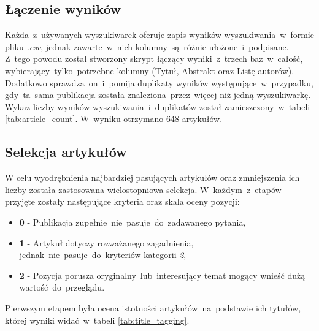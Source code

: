 \subsection{Łączenie wyników}
Każda~z~używanych wyszukiwarek oferuje zapis wyników wyszukiwania~w~formie pliku {\it .csv}, jednak zawarte~w~nich kolumny~są~różnie ułożone~i~podpisane. Z~tego powodu został stworzony skrypt łączący wyniki~z~trzech baz~w~całość, wybierający~tylko~potrzebne kolumny (Tytuł, Abstrakt oraz Listę autorów). Dodatkowo sprawdza~on~i~pomija duplikaty wyników występujące~w~przypadku, gdy~ta~sama publikacja została znaleziona~przez~więcej niż jedną wyszukiwarkę. Wykaz liczby wyników wyszukiwania~i~duplikatów został zamieszczony~w~tabeli \ref{tab:article_count}. W~wyniku otrzymano 648 artykułów.

\subsection{Selekcja artykułów}
W celu wyodrębnienia najbardziej pasujących artykułów oraz zmniejszenia ich liczby została zastosowana wielostopniowa selekcja. W~każdym~z~etapów przyjęte zostały następujące kryteria oraz skala oceny pozycji:
\begin{itemize}
    \item {\bf 0} - Publikacja zupełnie~nie~pasuje~do~zadawanego pytania,
    \item {\bf 1} - Artykuł dotyczy rozważanego zagadnienia, jednak~nie~pasuje~do~kryteriów kategorii {\it 2},
    \item {\bf 2} - Pozycja porusza oryginalny~lub~interesujący temat mogący wnieść dużą wartość~do~przeglądu.
\end{itemize}

Pierwszym etapem była ocena istotności artykułów~na~podstawie ich tytułów, której wyniki widać~w~tabeli \ref{tab:title_tagging}.

